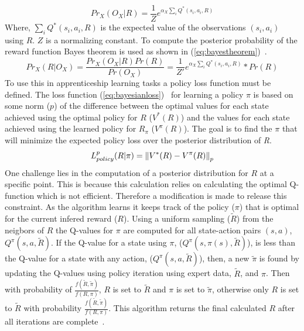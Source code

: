 \documentclass[12pt,american]{report}
\begin{document}
\begin{equation}
            \label{eq:bayseianliklihood}
            Pr_X(O_X|R) =  \frac{1}{Z}e^{\alpha_X\sum_{i}^{}Q^*(s_i,a_i,R)}%
        \end{equation}
Where, $\sum_{i}^{}Q^*(s_i,a_i,R)$ is the expected value of the observations $(s_i,a_i)$ using $R$. $Z$ is a normalizing constant. To compute the posterior probability of the reward function Bayes theorem is used as shown in (\ref{eq:bayestheorem})~\cite{ramachandran2007bayesian}.
\begin{equation}
            \label{eq:bayestheorem}
            Pr_X(R|O_X) =  \frac{Pr_X(O_X|R)Pr(R)}{Pr(O_X)}= \frac{1}{Z'}e^{\alpha_X\sum_{i}^{}Q^*(s_i,a_i,R)}*Pr(R)%
        \end{equation}
To use this in apprenticeship learning tasks a policy loss function must be defined. The loss function (\ref{eq:bayesianloss})~\cite{ramachandran2007bayesian} for learning a policy $\pi$ is based on some norm ($p$) of the difference between the optimal values for each state achieved using the optimal policy for $R$ ($V^*(R)$) and the values for each state achieved using the learned policy for $R_{\pi}$ ($V^\pi(R)$).  The goal is to find the $\pi$ that will minimize the expected policy loss over the posterior distribution of \textit{R}.  
\begin{equation}
            \label{eq:bayesianloss}
            L_{policy}^{p}(R|\pi)=\norm{V^*(R)-V^\pi(R)}_p%
        \end{equation}
One challenge lies in the computation of a posterior distribution for $R$ at a specific point.  This is because this calculation relies on calculating the optimal Q-function which is not efficient.  Therefore a modification is made to release this constraint.  As the algorithm learns it keeps track of the policy ($\pi$) that is optimal for the current infered reward ($R$).  Using a uniform sampling ($\tilde{R}$) from the neigbors of $R$ the Q-values for $\pi$ are computed for all state-action pairs $(s,a)$, $Q^\pi(s,a,\tilde{R})$. If the Q-value for a state using $\pi$, ($Q^\pi(s,\pi(s),\tilde{R})$), is less than the Q-value for a state with any action, ($Q^\pi(s,a,\tilde{R})$), then, a new $\tilde{\pi}$ is found by updating the Q-values using policy iteration using expert data, $\tilde{R}$, and $\pi$. Then with probability of $\frac{f(\tilde{R},\tilde{\pi})}{f(R,\pi)}$, $R$ is set to $\tilde{R}$ and $\pi$ is set to $\tilde{\pi}$, otherwise only $R$ is set to $\tilde{R}$  with probability $\frac{f(\tilde{R},\tilde{\pi})}{f(R,\pi)}$.  This algorithm returns the final calculated $R$ after all iterations are complete~\cite{ramachandran2007bayesian}.
\end{document}
